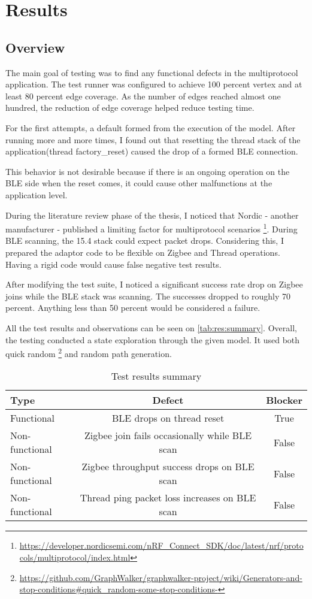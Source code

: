 \chapter{Results}
\section{Overview}
The main goal of testing was to find any functional defects in the multiprotocol application. The test runner was configured to achieve 100 percent vertex and at least 80 percent edge coverage. As the number of edges reached almost one hundred, the reduction of edge coverage helped reduce testing time.


For the first attempts, a default formed from the execution of the model. After running more and more times, I found out that resetting the thread stack of the application(thread factory\_reset) caused the drop of a formed BLE connection.


This behavior is not desirable because if there is an ongoing operation on the BLE side when the reset comes, it could cause other malfunctions at the application level.


During the literature review phase of the thesis, I noticed that Nordic - another manufacturer - published a limiting factor for multiprotocol scenarios \footnote{\url{https://developer.nordicsemi.com/nRF_Connect_SDK/doc/latest/nrf/protocols/multiprotocol/index.html}}. During BLE scanning, the 15.4 stack could expect packet drops. Considering this, I prepared the adaptor code to be flexible on Zigbee and Thread operations. Having a rigid code would cause false negative test results.


After modifying the test suite, I noticed a significant success rate drop on Zigbee joins while the BLE stack was scanning. The successes dropped to roughly 70 percent. Anything less than 50 percent would be considered a failure.

All the test results and observations can be seen on \autoref{tab:res:summary}.
Overall, the testing conducted a state exploration through the given model. It used both quick random
\footnote{\url{https://github.com/GraphWalker/graphwalker-project/wiki/Generators-and-stop-conditions\#quick_random-some-stop-conditions-}}
and random path generation.

\begin{table}
    \centering
    \begin{tabular}{ l c c }
        \toprule
        Type           & Defect                                        & Blocker \\
        \midrule
        Functional     & BLE drops on thread reset                     & True    \\
        Non-functional & Zigbee join fails occasionally while BLE scan & False   \\
        Non-functional & Zigbee throughput success drops on BLE scan   & False   \\
        Non-functional & Thread ping packet loss increases on BLE scan & False   \\
        \bottomrule
    \end{tabular}
    \caption{Test results summary}
    \label{tab:res:summary}
\end{table}